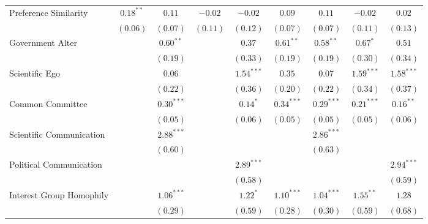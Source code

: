 \documentclass[fleqn,12pt]{wlscirep}
\begin{document}
\begin{landscape}
\begin{table}
\begin{center}
\begin{tabular}{l c c c c c c c c }
Preference Similarity      &    $0.18^{**}$            & $0.11$        &     $-0.02$           & $-0.02$       & $0.09$        & $0.11$        & $-0.02$       & $0.02$        \\
                        &     $(0.06)$           & $(0.07)$      &     $(0.11)$           & $(0.12)$      & $(0.07)$      & $(0.07)$      & $(0.11)$      & $(0.13)$      \\
Government Alter &               & $0.60^{**}$   &               & $0.37$        & $0.61^{**}$   & $0.58^{**}$   & $0.67^{*}$    & $0.51$        \\
                        &               & $(0.19)$      &               & $(0.33)$      & $(0.19)$      & $(0.19)$      & $(0.30)$      & $(0.34)$      \\
Scientific Ego &               & $0.06$        &               & $1.54^{***}$  & $0.35$        & $0.07$        & $1.59^{***}$  & $1.58^{***}$  \\
                        &               & $(0.22)$      &               & $(0.36)$      & $(0.20)$      & $(0.22)$      & $(0.34)$      & $(0.37)$      \\
Common Committee      &               & $0.30^{***}$  &               & $0.14^{*}$    & $0.34^{***}$  & $0.29^{***}$  & $0.21^{***}$  & $0.16^{**}$   \\
                        &               & $(0.05)$      &               & $(0.06)$      & $(0.05)$      & $(0.05)$      & $(0.05)$      & $(0.06)$      \\
Scientific Communication          &               & $2.88^{***}$  &               &               &               & $2.86^{***}$  &               &               \\
                        &               & $(0.60)$      &               &               &               & $(0.63)$      &               &               \\
Political Communication          &               &               &               & $2.89^{***}$  &               &               &               & $2.94^{***}$  \\
                        &               &               &               & $(0.58)$      &               &               &               & $(0.59)$      \\
Interest Group Homophily       &               & $1.06^{***}$  &               & $1.22^{*}$    & $1.10^{***}$  & $1.04^{***}$  & $1.55^{**}$   & $1.28$        \\
                        &               & $(0.29)$      &               & $(0.59)$      & $(0.28)$      & $(0.30)$      & $(0.59)$      & $(0.68)$      \\

\end{tabular}
\end{center}
\end{table}
\end{landscape}
\end{document}
